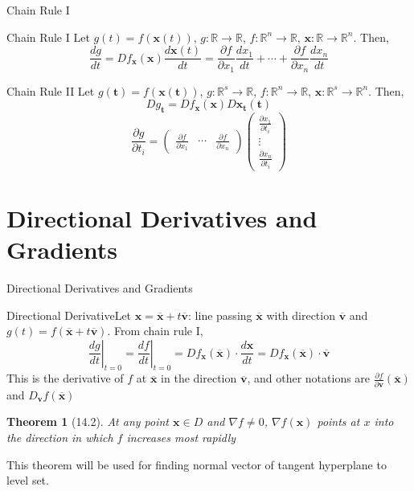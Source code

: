\documentclass[a4paper,11pt]{article}
\newtheorem{thm}{Theorem}
\newcommand{\bb}{\mathbb}
\newcommand{\bd}{\mathbf}
\newcommand{\p}{\partial}
\begin{document}
\begin{frame}[t]{Chain Rule I}
	\begin{block}
		{Chain Rule I}
		Let $g(t)=f(\bd{x}(t))$, $g:\bb{R}\rightarrow\bb{R}$, $f:\bb{R}^n\rightarrow\bb{R}$, $\bd x :\bb{R}\rightarrow\bb{R}^n$. Then, \[
			\frac{d g}{dt} = Df_{\bd x}(\bd x) \frac {d\bd x(t)}{dt} = \frac{\p f}{\p x_1}\frac{dx_1}{dt}+ \cdots +\frac{\p f}{\p x_n}\frac{dx_n}{dt}
		\]
	\end{block}
	\begin{block}
		{Chain Rule II}
		Let $g(\bd t)=f(\bd{x}(\bd t))$, $g:\bb{R}^s\rightarrow\bb{R}$, $f:\bb{R}^n\rightarrow\bb{R}$, $\bd x :\bb{R}^s\rightarrow\bb{R}^n$. Then, \[
			Dg_{\bd t} = Df_{\bd x}(\bd x) D {\bd x_{\bd t}(\bd t)}
			\]\[
				\frac{\p g}{\p t_i} = \begin{pmatrix}
					\frac{\p f}{\p x_1} & \cdots & \frac{\p f}{\p x_n}
				\end{pmatrix}\begin{pmatrix}
					\frac{\p x_1 }{\p t_i}\\
					\vdots\\
					\frac{\p x_n }{\p t_i}
				\end{pmatrix}
			\]
	\end{block}
\end{frame}
\section{Directional Derivatives and Gradients} %
\label{sec:directional_derivatives_and_gradients}
\begin{frame}[t]{Directional Derivatives and Gradients}
	\begin{block}
		{Directional Derivative}Let $\bd x = \overline{\bd x} + t \overline{\bd v}$: line passing $\overline{\bd x}$ with direction $\overline{\bd v}$ and $g(t) = f(\overline{\bd x} + t \overline{\bd v})$. From chain rule I, \[
			\left.\frac{dg}{dt}\right\vert_{t=0} = \left.\frac{df}{dt}\right\vert_{t=0}= Df_{\bd x} (\overline{\bd x}) \cdot \frac{d\bd x}{dt} = Df_{\bd x} (\overline{\bd x})\cdot\overline{\bd v}
		\]This is the derivative of $f$ at $\overline{\bd x}$ in the direction $\overline{\bd v}$, and other notations are $\frac{\p f}{\p \bd v}(\overline{\bd x})$ and $D_{\bd v}f(\overline{\bd x})$
	\end{block}
	\begin{thm}
		[14.2] At any point $\bd x\in D$ and $\nabla f \neq 0$, $\nabla f(\bd x)$ points at $x$ into the direction in which $f$ increases most rapidly
	\end{thm}
	This theorem will be used for finding normal vector of tangent hyperplane to level set.
\end{frame}
\end{document}
